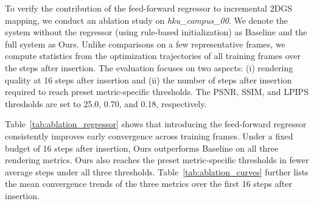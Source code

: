 \documentclass[letterpaper,journal]{IEEEtran}
\newcommand{\datasetname}[1]{\mbox{\normalfont\itshape #1}}
\begin{document}
To verify the contribution of the feed-forward regressor to incremental 2DGS mapping, we conduct an ablation study on \datasetname{hku\_campus\_00}. We denote the system without the regressor (using rule-based initialization) as Baseline and the full system as Ours. Unlike comparisons on a few representative frames, we compute statistics from the optimization trajectories of all training frames over the steps after insertion. The evaluation focuses on two aspects: (i) rendering quality at 16 steps after insertion and (ii) the number of steps after insertion required to reach preset metric-specific thresholds. The PSNR, SSIM, and LPIPS thresholds are set to 25.0, 0.70, and 0.18, respectively.

\begin{table}[!t]
\centering
\caption{Ablation results on \datasetname{hku\_campus\_00}. Statistics are computed over the optimization trajectories of all training frames. Part (a) reports rendering quality at 16 steps after insertion; Part (b) reports the mean $\pm$ std steps after insertion required to reach preset quality thresholds.}
\label{tab:ablation_regressor}
\renewcommand{\arraystretch}{1.18}
\end{table}

Table~\ref{tab:ablation_regressor} shows that introducing the feed-forward regressor consistently improves early convergence across training frames. Under a fixed budget of 16 steps after insertion, Ours outperforms Baseline on all three rendering metrics. Ours also reaches the preset metric-specific thresholds in fewer average steps under all three thresholds. Table~\ref{tab:ablation_curves} further lists the mean convergence trends of the three metrics over the first 16 steps after insertion.
\end{document}
